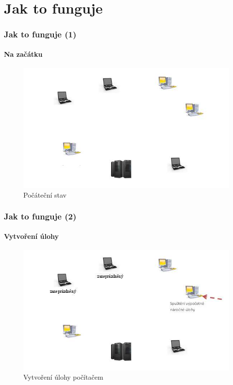 \documentclass{beamer}
\begin{document}
\section{Jak to funguje}
\begin {frame}
\frametitle{Jak to funguje (1)}
\framesubtitle {Na začátku}
	\begin {figure}
		\includegraphics[height=0.7\textheight]{faze0}
		\caption{Počáteční stav}
	\end {figure}
\end {frame}

\begin {frame}
\frametitle{Jak to funguje (2)}
\framesubtitle {Vytvoření úlohy}
	\begin {figure}
		\includegraphics[height=0.7\textheight]{faze1}
		\caption{Vytvoření úlohy počítačem}
	\end {figure}
\end {frame}
\end{document}
